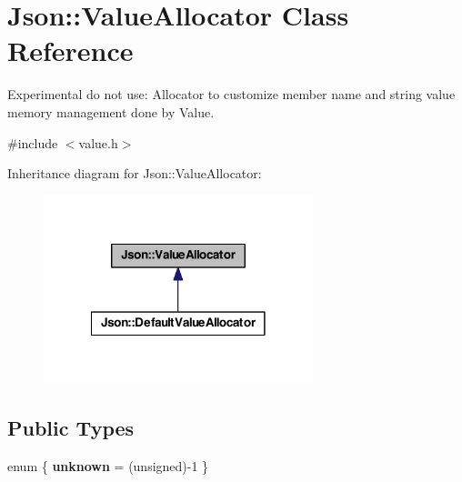 \hypertarget{class_json_1_1_value_allocator}{\section{Json\-:\-:Value\-Allocator Class Reference}
\label{class_json_1_1_value_allocator}
}


Experimental do not use\-: Allocator to customize member name and string value memory management done by Value.  




{\ttfamily \#include $<$value.\-h$>$}



Inheritance diagram for Json\-:\-:Value\-Allocator\-:
\nopagebreak
\begin{figure}[H]
\begin{center}
\leavevmode
\includegraphics[width=222pt]{class_json_1_1_value_allocator__inherit__graph}
\end{center}
\end{figure}
\subsection*{Public Types}
\begin{DoxyCompactItemize}
\item 
enum \{ {\bfseries unknown} =  (unsigned)-\/1
 \}
\end{DoxyCompactItemize}
